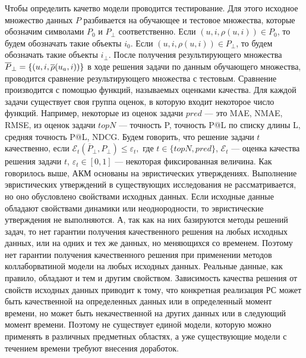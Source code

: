 Чтобы определить качетво модели
проводится тестирование. Для этого исходное множество данных $P$
разбивается на обучающее и тестовое множества, которые обозначим символами
$P_0$ и $P_{\bot}$ соответственно.
Если $(u, i, \rho(u, i)) \in P_0$, то будем обозначать такие объекты $i_0$.
Если $(u, i, \rho(u, i)) \in P_{\bot}$, то будем обозначать такие объекты $i_{\bot}$.
После получения результирующего множества
$\overline{P}_{\bot} = \{(u, i, \overline{\rho}(u_a, i))\}$ в ходе решения задачи
по данным обучающего множества, проводится
сравнение результирующего множества с тестовым. Сравнение производится
с помощью функций, называемых оценками качества. Для каждой задачи существует
своя группа оценок, в которую входит некоторое число функций. Например,
некоторые из оценок задачи $pred$ --- это MAE, NMAE, RMSE,
из оценок задачи $topN$ --- точность P, точность P@L по списку длины L, средняя точность
P@L, NDCG.
Будем говорить, что решение задачи $t$ качественно,
если $\mathcal{E}_{t}(\overline{P}_{\bot}, P_{\bot}) \le \varepsilon_{t},$ где
$t \in \{topN, pred\}$, $\mathcal{E}_{t}$ --- оценка качества
решения задачи $t$, $\varepsilon_{t} \in [0,1]$ --- некоторая фиксированная
величина.
Как говорилось выше, АКМ основаны на эвристических утверждениях.
Выполнение эвристических утверждений в существующих исследования
не рассматривается, но оно обусловлено свойствами исходных данных.
Если исходные данные обладают свойствами динамики или неоднородности, то
эвристические утверждения не выполняются. А, так как на них базируются методы
решений задач, то нет гарантии получения качественного решения
на любых исходных данных, или на одних
и тех же данных, но меняющихся со временем. Поэтому нет гарантии получения качественного решения
при применении методов коллаборватиной модели на любых исходных данных.
Реальные данные, как
правило, обладают и тем и другим свойством. Зависимость качества решения
от свойств исходных данных приводит к тому,
что конкретная реализация РС может быть качественной на определенных
данных или в определенный момент времени,
но может быть некачественной на других данных или в следующий момент времени.
Поэтому не существует единой модели, которую можно
применять в различных предметных областях, а уже существующие модели с течением
времени требуют внесения доработок.

